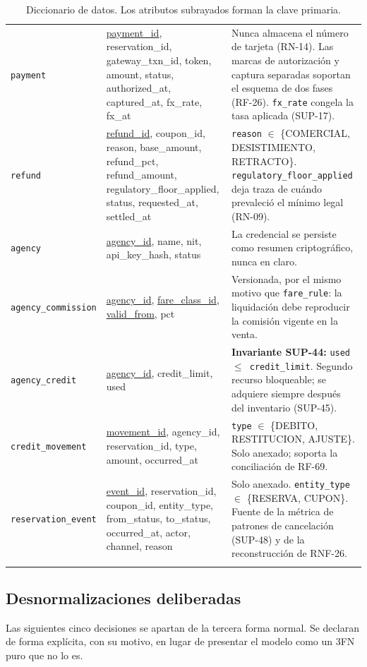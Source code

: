 \documentclass[10pt,letterpaper]{article}
\begin{document}
\begin{longtable}{@{}L{3.0cm} L{6.6cm} L{6.2cm}@{}}
\texttt{payment} & \underline{payment\_id}, reservation\_id, gateway\_txn\_id, token, amount, status, authorized\_at, captured\_at, fx\_rate, fx\_at & Nunca almacena el número de tarjeta (RN-14). Las marcas de autorización y captura separadas soportan el esquema de dos fases (RF-26). \texttt{fx\_rate} congela la tasa aplicada (SUP-17). \\
\texttt{refund} & \underline{refund\_id}, coupon\_id, reason, base\_amount, refund\_pct, refund\_amount, regulatory\_floor\_applied, status, requested\_at, settled\_at & \texttt{reason} $\in$ \{COMERCIAL, DESISTIMIENTO, RETRACTO\}. \texttt{regulatory\_floor\_applied} deja traza de cuándo prevaleció el mínimo legal (RN-09). \\
\texttt{agency} & \underline{agency\_id}, name, nit, api\_key\_hash, status & La credencial se persiste como resumen criptográfico, nunca en claro. \\
\texttt{agency\_commission} & \underline{agency\_id}, \underline{fare\_class\_id}, \underline{valid\_from}, pct & Versionada, por el mismo motivo que \texttt{fare\_rule}: la liquidación debe reproducir la comisión vigente en la venta. \\
\texttt{agency\_credit} & \underline{agency\_id}, credit\_limit, used & \textbf{Invariante SUP-44:} \texttt{used $\le$ credit\_limit}. Segundo recurso bloqueable; se adquiere siempre después del inventario (SUP-45). \\
\texttt{credit\_movement} & \underline{movement\_id}, agency\_id, reservation\_id, type, amount, occurred\_at & \texttt{type} $\in$ \{DEBITO, RESTITUCION, AJUSTE\}. Solo anexado; soporta la conciliación de RF-69. \\
\texttt{reservation\_event} & \underline{event\_id}, reservation\_id, coupon\_id, entity\_type, from\_status, to\_status, occurred\_at, actor, channel, reason & Solo anexado. \texttt{entity\_type} $\in$ \{RESERVA, CUPON\}. Fuente de la métrica de patrones de cancelación (SUP-48) y de la reconstrucción de RNF-26. \\
\bottomrule
\caption{Diccionario de datos. Los atributos subrayados forman la clave primaria.}
\end{longtable}

\subsection{Desnormalizaciones deliberadas}
\label{sec:desnorm}
Las siguientes cinco decisiones se apartan de la tercera forma normal. Se declaran de forma explícita, con su motivo, en lugar de presentar el modelo como un 3FN puro que no lo es.
\end{document}
